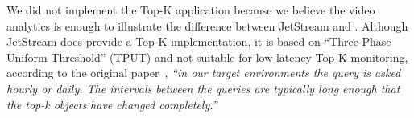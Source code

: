 We did not implement the Top-K application because we believe the video
analytics is enough to illustrate the difference between JetStream and
\sysname{}. Although JetStream does provide a Top-K implementation, it is based
on ``Three-Phase Uniform Threshold'' (TPUT) and not suitable for low-latency
Top-K monitoring, according to the original paper~\cite{cao2004efficient},
\textit{``in our target environments the query is asked hourly or daily. The
  intervals between the queries are typically long enough that the top-k objects
  have changed completely.''}


